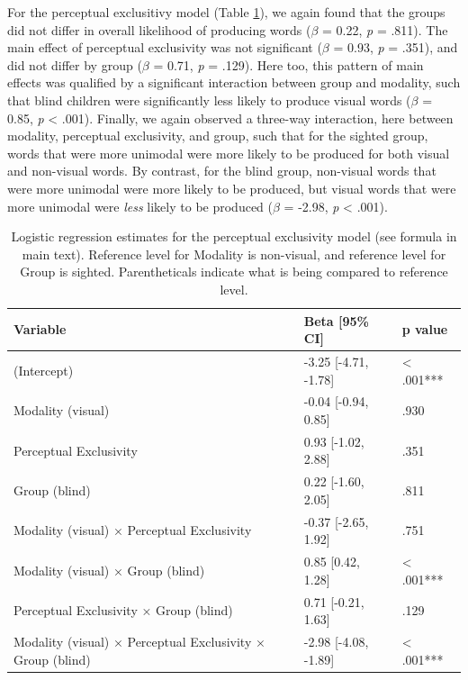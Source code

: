 \documentclass[english,man,floatsintext]{apa6}
\begin{document}
For the perceptual exclusitivy model (Table \ref{tab:excl-table}), we again found that the groups did not differ in overall likelihood of producing words (\(\beta\) = 0.22, \emph{p} = .811). The main effect of perceptual exclusivity was not significant (\(\beta\) = 0.93, \emph{p} = .351), and did not differ by group (\(\beta\) = 0.71, \emph{p} = .129). Here too, this pattern of main effects was qualified by a significant interaction between group and modality, such that blind children were significantly less likely to produce visual words (\(\beta\) = 0.85, \emph{p} \textless{} .001). Finally, we again observed a three-way interaction, here between modality, perceptual exclusivity, and group, such that for the sighted group, words that were more unimodal were more likely to be produced for both visual and non-visual words. By contrast, for the blind group, non-visual words that were more unimodal were more likely to be produced, but visual words that were more unimodal were \emph{less} likely to be produced (\(\beta\) = -2.98, \emph{p} \textless{} .001).

\begin{table}[H]

\caption{\label{tab:excl-table}Logistic regression estimates for the perceptual exclusivity model (see formula in main text). Reference level for Modality is non-visual, and reference level for Group is sighted. Parentheticals indicate what is being compared to reference level.}
\centering
\begin{tabular}[t]{l|l|l}
\hline
Variable & Beta [95\% CI] & p value\\
\hline
(Intercept) & -3.25 [-4.71, -1.78] & < .001***\\
\hline
Modality (visual) & -0.04 [-0.94, 0.85] & .930\\
\hline
Perceptual Exclusivity & 0.93 [-1.02, 2.88] & .351\\
\hline
Group (blind) & 0.22 [-1.60, 2.05] & .811\\
\hline
Modality (visual) × Perceptual Exclusivity & -0.37 [-2.65, 1.92] & .751\\
\hline
Modality (visual) × Group (blind) & 0.85 [0.42, 1.28] & < .001***\\
\hline
Perceptual Exclusivity × Group (blind) & 0.71 [-0.21, 1.63] & .129\\
\hline
Modality (visual) × Perceptual Exclusivity × Group (blind) & -2.98 [-4.08, -1.89] & < .001***\\
\hline
\end{tabular}
\end{table}
\end{document}
